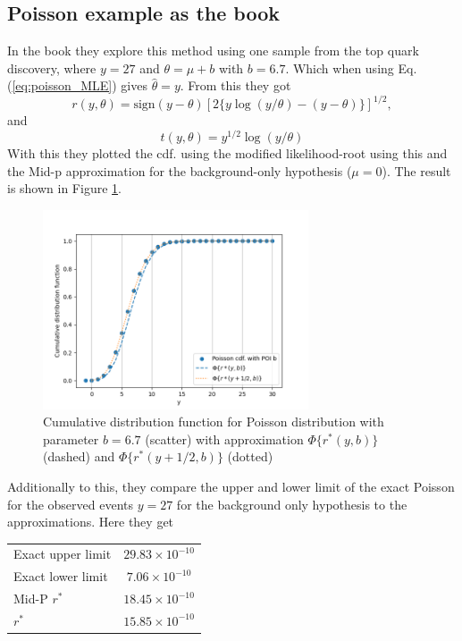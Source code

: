 \documentclass[14pt, a4paper]{article}  %
\begin{document}
\subsection{Poisson example as the book}
In the book they explore this method using one sample from the top quark discovery, where $y=27$ and $\theta=\mu+b$ with $b=6.7$. Which when using Eq. (\ref{eq:poisson_MLE}) gives $\hat{\theta}=y$. From this they got 
$$
r(y,\theta) = \text{sign}(y-\theta)[2\{y\log(y/\theta)-(y-\theta)\}]^{1/2},
$$
and 
$$
t(y,\theta)=y^{1/2}\log(y/\theta)
$$
With this they plotted the cdf. using the modified likelihood-root using this and the Mid-p  approximation for the background-only hypothesis ($\mu=0$). The result is shown in Figure  \ref{fig:book_cdf}.
\begin{figure}[!ht]
	\centering
        \includegraphics[width=0.7\textwidth]{book_example/Book_examplesbook_cdf.png}
	\caption{Cumulative distribution function for Poisson distribution with parameter $b=6.7$ (scatter) with approximation $\Phi\{r^*(y,b)\}$ (dashed) and $\Phi\{r^*(y+1/2,b)\}$ (dotted)}\label{fig:book_cdf}
\end{figure} 
Additionally to this, they compare the upper and lower limit of the exact Poisson for the observed events $y=27$ for the background only hypothesis to the approximations. Here they get
\begin{table}[!ht]
    \centering
    \begin{tabular}{l|c}
         Exact upper limit & $29.83\times10^{-10}$ \\
         Exact lower limit & $7.06\times10^{-10}$ \\
         Mid-P $r^*$& $18.45\times10^{-10}$ \\
         $r^*$ & $15.85\times10^{-10}$\\
    \end{tabular}
\end{table}
\end{document}
